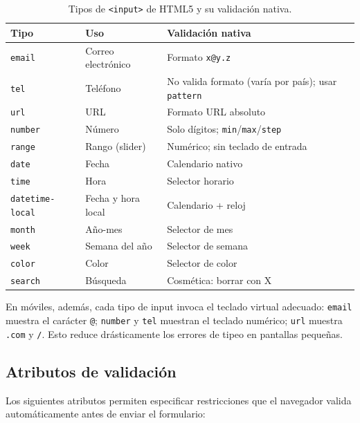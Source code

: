 \documentclass[11pt,a4paper,openany]{book}
\begin{document}
\begin{table}[htbp]
\centering
\caption{Tipos de \texttt{<input>} de HTML5 y su validación nativa.}
\label{tab:input-types}
\footnotesize
\begin{tabularx}{\textwidth}{lXX}
\toprule
\textbf{Tipo} & \textbf{Uso} & \textbf{Validación nativa}\\
\midrule
\texttt{email} & Correo electrónico & Formato \texttt{x@y.z}\\
\texttt{tel} & Teléfono & No valida formato (varía por país); usar \texttt{pattern}\\
\texttt{url} & URL & Formato URL absoluto\\
\texttt{number} & Número & Solo dígitos; \texttt{min}/\texttt{max}/\texttt{step}\\
\texttt{range} & Rango (slider) & Numérico; sin teclado de entrada\\
\texttt{date} & Fecha & Calendario nativo\\
\texttt{time} & Hora & Selector horario\\
\texttt{datetime-local} & Fecha y hora local & Calendario + reloj\\
\texttt{month} & Año-mes & Selector de mes\\
\texttt{week} & Semana del año & Selector de semana\\
\texttt{color} & Color & Selector de color\\
\texttt{search} & Búsqueda & Cosmética: borrar con X\\
\bottomrule
\end{tabularx}
\end{table}

En móviles, además, cada tipo de input invoca el teclado virtual
adecuado: \texttt{email} muestra el carácter \texttt{@};
\texttt{number} y \texttt{tel} muestran el teclado numérico;
\texttt{url} muestra \texttt{.com} y \texttt{/}. Esto reduce
drásticamente los errores de tipeo en pantallas pequeñas.

\subsection{Atributos de validación}

Los siguientes atributos permiten especificar restricciones que el
navegador valida automáticamente antes de enviar el formulario:
\end{document}

